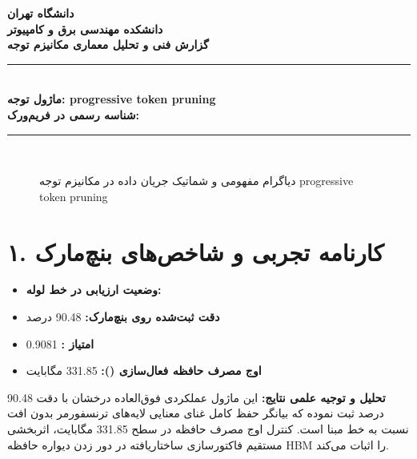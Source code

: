 \documentclass[12pt,a4paper]{article}
\begin{document}
\begin{center}
{\Large\bfseries دانشگاه تهران}\\[0.2cm]
{\large\bfseries دانشکده مهندسی برق و کامپیوتر}\\[0.2cm]
{\large\bfseries گزارش فنی و تحلیل معماری مکانیزم توجه}\\[0.5cm]
\rule{\linewidth}{1pt}\\[0.3cm]
{\LARGE\bfseries ماژول توجه: progressive token pruning}\\[0.2cm]
{\large \textbf{شناسه رسمی در فریم‌ورک:} }\\[0.2cm]
\rule{\linewidth}{1pt}\\[0.5cm]
\end{center}

\begin{figure}[H]
\centering
{}
\caption{دیاگرام مفهومی و شماتیک جریان داده در مکانیزم توجه progressive token pruning}
\end{figure}

\section*{۱. کارنامه تجربی و شاخص‌های بنچ‌مارک}
\begin{itemize}
\item \textbf{وضعیت ارزیابی در خط لوله:} 
\item \textbf{دقت ثبت‌شده روی بنچ‌مارک:} 90.48 درصد
\item \textbf{امتیاز :} 0.9081
\item \textbf{اوج مصرف حافظه فعال‌سازی ():} 331.85 مگابایت
\end{itemize}
\textbf{تحلیل و توجیه علمی نتایج:} این ماژول عملکردی فوق‌العاده درخشان با دقت 90.48 درصد ثبت نموده که بیانگر حفظ کامل غنای معنایی لایه‌های ترنسفورمر بدون افت نسبت به خط مبنا است. کنترل اوج مصرف حافظه در سطح 331.85 مگابایت، اثربخشی مستقیم فاکتورسازی ساختاریافته در دور زدن دیواره حافظه HBM را اثبات می‌کند.
\end{document}
